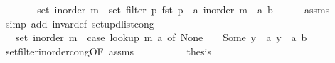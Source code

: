 \begin{isabellebody}
\ \ \isamarkupfalse%
\ \isamarkupfalse%
\ {\isachardoublequoteopen}{\isachardot}{\kern0pt}{\isachardot}{\kern0pt}{\isachardot}{\kern0pt}\ {\isacharequal}{\kern0pt}\ set\ {\isacharparenleft}{\kern0pt}inorder\ m{\isacharparenright}{\kern0pt}\ {\isacharminus}{\kern0pt}\ set\ {\isacharparenleft}{\kern0pt}filter\ {\isacharparenleft}{\kern0pt}{\isasymlambda}p{\isachardot}{\kern0pt}\ fst\ p\ {\isacharequal}{\kern0pt}\ a{\isacharparenright}{\kern0pt}\ {\isacharparenleft}{\kern0pt}inorder\ m{\isacharparenright}{\kern0pt}{\isacharparenright}{\kern0pt}\ {\isasymunion}\ {\isacharbraceleft}{\kern0pt}{\isacharparenleft}{\kern0pt}a{\isacharcomma}{\kern0pt}\ b{\isacharparenright}{\kern0pt}{\isacharbraceright}{\kern0pt}{\isachardoublequoteclose}\isanewline
\ \ \ \ \isamarkupfalse%
\ assms\isanewline
\ \ \ \ \isamarkupfalse%
\ {\isacharparenleft}{\kern0pt}simp\ add{\isacharcolon}{\kern0pt}\ invar{\isacharunderscore}{\kern0pt}def\ set{\isacharunderscore}{\kern0pt}upd{\isacharunderscore}{\kern0pt}list{\isacharunderscore}{\kern0pt}cong{\isacharparenright}{\kern0pt}\isanewline
\ \ \isamarkupfalse%
\ \isamarkupfalse%
\ {\isachardoublequoteopen}{\isachardot}{\kern0pt}{\isachardot}{\kern0pt}{\isachardot}{\kern0pt}\ {\isacharequal}{\kern0pt}\ set\ {\isacharparenleft}{\kern0pt}inorder\ m{\isacharparenright}{\kern0pt}\ {\isacharminus}{\kern0pt}\ {\isacharparenleft}{\kern0pt}case\ lookup\ m\ a\ of\ None\ {\isasymRightarrow}\ {\isacharbraceleft}{\kern0pt}{\isacharbraceright}{\kern0pt}\ {\isacharbar}{\kern0pt}\ Some\ y\ {\isasymRightarrow}\ {\isacharbraceleft}{\kern0pt}{\isacharparenleft}{\kern0pt}a{\isacharcomma}{\kern0pt}\ y{\isacharparenright}{\kern0pt}{\isacharbraceright}{\kern0pt}{\isacharparenright}{\kern0pt}\ {\isasymunion}\ {\isacharbraceleft}{\kern0pt}{\isacharparenleft}{\kern0pt}a{\isacharcomma}{\kern0pt}\ b{\isacharparenright}{\kern0pt}{\isacharbraceright}{\kern0pt}{\isachardoublequoteclose}\isanewline
\ \ \ \ \isamarkupfalse%
\ set{\isacharunderscore}{\kern0pt}filter{\isacharunderscore}{\kern0pt}inorder{\isacharunderscore}{\kern0pt}cong{\isacharbrackleft}{\kern0pt}OF\ assms{\isacharbrackright}{\kern0pt}\isanewline
\ \ \ \ \isacommand{{\isachardot}{\kern0pt}{\isachardot}{\kern0pt}}\isamarkupfalse%
\isanewline
\ \ \isamarkupfalse%
\ \isamarkupfalse%
\ {\isacharquery}{\kern0pt}thesis\isanewline
\ \ \ \ \isacommand{{\isachardot}{\kern0pt}}\isamarkupfalse%
\isanewline
{}\isamarkupfalse%
%
\endisatagproof
{\isafoldproof}%
%
\isadelimproof
\isanewline
%
\endisadelimproof
%
\isadelimtheory
\isanewline
%
\endisadelimtheory
%
\isatagtheory
{}\isamarkupfalse%
%
\endisatagtheory
{\isafoldtheory}%
%
\isadelimtheory
%
\endisadelimtheory
%
\end{isabellebody}%
